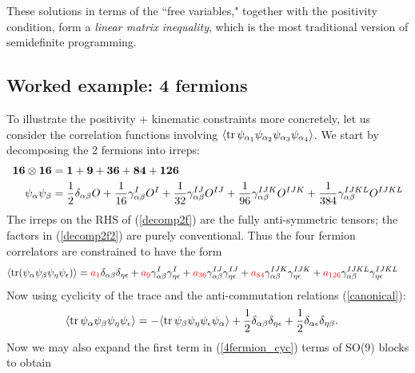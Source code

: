 \documentclass[11pt]{article}
\def\nref#1{(\ref{#1})}
\renewcommand{\ev}[1]{\langle #1 \rangle} %
\def\red{\color{red}}
\begin{document}
These solutions in terms of the ``free variables," together with the positivity condition, form a \textit{linear matrix inequality}, which is the most traditional version of semidefinite programming.


\subsection{Worked example: 4 fermions}\label{sec: example}
To illustrate the positivity + kinematic constraints more concretely, let us consider the correlation functions involving $\ev{\tr \psi_{\alpha_1} \psi_{\alpha_2} \psi_{\alpha_3} \psi_{\alpha_4}}$.
We start by decomposing the 2 fermions into irreps:
\begin{align}
{\bf 16} \otimes {\bf 16} &= {\bf 1} + {\bf 9} + {\bf 36} + {\bf 84} + {\bf 126} \label{decomp2f}\\
    \psi_\alpha \psi_\beta &=\frac{1}{2} \delta_{\alpha\beta} O+\frac{1}{16}\gamma^I_{\alpha\beta} O^I+\frac{1}{32}\gamma^{IJ}_{\alpha\beta} O^{IJ}+\frac{1}{96}\gamma^{IJK}_{\alpha\beta} O^{IJK}+\frac{1}{384}\gamma^{IJKL}_{\alpha\beta} O^{IJKL} \label{decomp2f2}
\end{align}
The irreps on the RHS of \nref{decomp2f} are the fully anti-symmetric tensors; the factors in \nref{decomp2f2} are purely conventional.
Thus the four fermion correlators are constrained to have the form
\begin{align}
\label{4fermion}
        \ev{\tr(\psi_\alpha \psi_\beta \psi_\eta \psi_\epsilon)}
    &={\red a_1} \delta_{\alpha \beta} \delta_{\eta \epsilon}+{\red a_9} \gamma_{\alpha \beta}^I \gamma_{\eta \epsilon}^I+ {\red a_{36}} \gamma_{\alpha \beta}^{I J} \gamma_{\eta \epsilon}^{I J}+ {\red a_{84}} \gamma_{\alpha \beta}^{I J K} \gamma_{\eta\epsilon}^{I J K}+{\red a_{126}} \gamma_{\alpha \beta}^{I J K L} \gamma_{\eta\epsilon}^{I J K L}
\end{align}
Now using cyclicity of the trace and the anti-commutation relations \nref{canonical}:
\begin{align}
   \ev{\tr \psi_\alpha \psi_\beta \psi_\eta \psi_\epsilon}  &=-\ev{\tr \psi_\beta \psi_\eta \psi_\epsilon \psi_\alpha} + \frac{1}{2}\delta_{\alpha\beta}\delta_{\eta\epsilon}+\frac{1}{2}\delta_{\alpha\epsilon}\delta_{\eta\beta}  .\label{4fermion_cyc}
\end{align}
Now we may also expand the first term in \nref{4fermion_cyc} terms of SO(9) blocks to obtain
\end{document}

